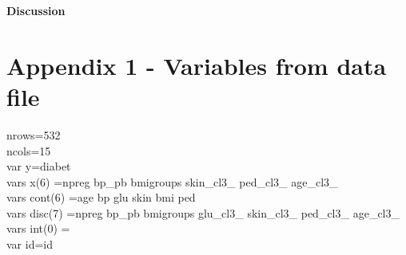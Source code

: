\documentclass[12pt]{article}
\begin{document}
\newpage
 
\noindent \textbf{Discussion}
 
\newpage
\section*{Appendix 1 - Variables from data file}
\noindent nrows=532\\
\noindent ncols=15\\
\noindent var y=diabet\\
\noindent vars x(6) =npreg bp\_pb bmigroups skin\_cl3\_ ped\_cl3\_ age\_cl3\_\\
\noindent vars cont(6) =age bp glu skin bmi ped\\
\noindent vars disc(7) =npreg bp\_pb bmigroups glu\_cl3\_ skin\_cl3\_ ped\_cl3\_ age\_cl3\_\\
\noindent vars int(0) =\\
\noindent var id=id\\
\newpage
\pagestyle{empty}
\end{document}
